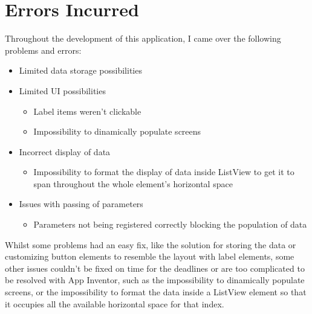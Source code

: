 \chapter{Errors Incurred}

Throughout the development of this application, I came over the following problems and errors:
\begin{itemize}
  \item Limited data storage possibilities
  \item Limited UI possibilities
  \begin{itemize}
    \item Label items weren't clickable
    \item Impossibility to dinamically populate screens
  \end{itemize}
  \item Incorrect display of data
  \begin{itemize}
    \item Impossibility to format the display of data inside ListView to get it to span throughout the whole element's horizontal space
  \end{itemize}
  \item Issues with passing of parameters
  \begin{itemize}
    \item Parameters not being registered correctly blocking the population of data
  \end{itemize}
\end{itemize}

Whilst some problems had an easy fix, like the solution for storing the data or customizing button elements to resemble the layout with label elements, some other issues couldn't be fixed on time for the deadlines or are too complicated to be resolved with App Inventor, such as the impossibility to dinamically populate screens, or the impossibility to format the data inside a ListView element so that it occupies all the available horizontal space for that index.
